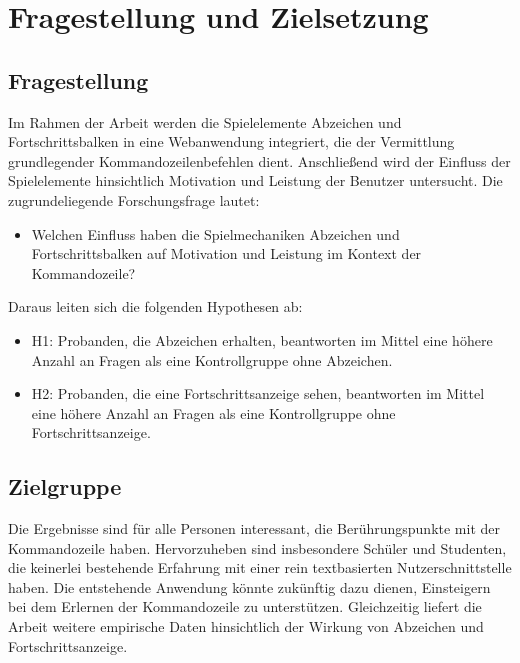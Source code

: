 \documentclass[
    a4paper,
    doc,
    12pt,
    natbib,
]{apa6}
\begin{document}
\newpage

\section{Fragestellung und Zielsetzung}

\subsection{Fragestellung}
Im Rahmen der Arbeit werden die Spielelemente Abzeichen und Fortschrittsbalken in eine Webanwendung integriert, die der Vermittlung grundlegender Kommandozeilenbefehlen dient.
Anschließend wird der Einfluss der Spielelemente hinsichtlich Motivation und Leistung der Benutzer untersucht.
Die zugrundeliegende Forschungsfrage lautet:

\begin{itemize}
    \item Welchen Einfluss haben die Spielmechaniken Abzeichen und Fortschrittsbalken auf Motivation und Leistung im Kontext der Kommandozeile?
\end{itemize}

Daraus leiten sich die folgenden Hypothesen ab:

\begin{itemize}
\item H1: Probanden, die Abzeichen erhalten, beantworten im Mittel eine höhere Anzahl an Fragen als eine Kontrollgruppe ohne Abzeichen.
\item H2: Probanden, die eine Fortschrittsanzeige sehen, beantworten im Mittel eine höhere Anzahl an Fragen als eine Kontrollgruppe ohne Fortschrittsanzeige.
\end{itemize}

\subsection{Zielgruppe}
Die Ergebnisse sind für alle Personen interessant, die Berührungspunkte mit der Kommandozeile haben.
Hervorzuheben sind insbesondere Schüler und Studenten, die keinerlei bestehende Erfahrung mit einer rein textbasierten Nutzerschnittstelle haben.
Die entstehende Anwendung könnte zukünftig dazu dienen, Einsteigern bei dem Erlernen der Kommandozeile zu unterstützen.
Gleichzeitig liefert die Arbeit weitere empirische Daten hinsichtlich der Wirkung von Abzeichen und Fortschrittsanzeige.
\end{document}
